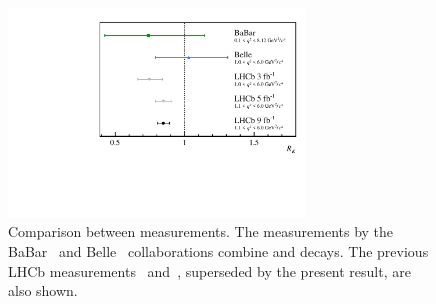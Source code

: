 \begin{figure}[!h]
    \centering
    \includegraphics[width=0.7\textwidth]{figures/FigS5.pdf}
    \caption{Comparison between \RK measurements. 
    The measurements by the BaBar~\cite{RKbabar} and Belle~\cite{RKbelle} collaborations combine \BuKll and \BdKSll decays. The previous LHCb measurements~\cite{LHCb-PAPER-2019-009} and~\cite{LHCb-PAPER-2014-024}, superseded by the present result, are also shown.
    \label{fig:RKresultOld}}
\end{figure}